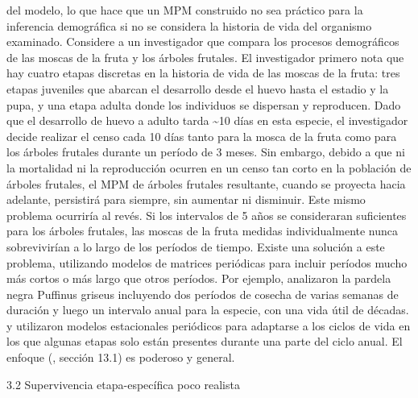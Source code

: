 \documentclass[
]{book}
\theoremstyle{definition}
\theoremstyle{definition}
\theoremstyle{definition}
\theoremstyle{definition}
\theoremstyle{remark}
\begin{document}
del modelo, lo que hace que un MPM construido no sea práctico para la inferencia demográfica si no se considera la historia de vida del organismo examinado. Considere a un investigador que compara los procesos demográficos de las moscas de la fruta y los árboles frutales. El investigador primero nota que hay cuatro etapas discretas en la historia de vida de las moscas de la fruta: tres etapas juveniles que abarcan el desarrollo desde el huevo hasta el estadio y la pupa, y una etapa adulta donde los individuos se dispersan y reproducen. Dado que el desarrollo de huevo a adulto tarda \textasciitilde10 días en esta especie, el investigador decide realizar el censo cada 10 días tanto para la mosca de la fruta como para los árboles frutales durante un período de 3 meses. Sin embargo, debido a que ni la mortalidad ni la reproducción ocurren en un censo tan corto en la población de árboles frutales, el MPM de árboles frutales resultante, cuando se proyecta hacia adelante, persistirá para siempre, sin aumentar ni disminuir. Este mismo problema ocurriría al revés. Si los intervalos de 5 años se consideraran suficientes para los árboles frutales, las moscas de la fruta medidas individualmente nunca sobrevivirían a lo largo de los períodos de tiempo. Existe una solución a este problema, utilizando modelos de matrices periódicas para incluir períodos mucho más cortos o más largo que otros períodos. Por ejemplo, \citet{hunter2010climate} analizaron la pardela negra Puffinus griseus incluyendo dos períodos de cosecha de varias semanas de duración y luego un intervalo anual para la especie, con una vida útil de décadas. \citet{smith2005stochastic} y \citet{shyu2013seasonal} utilizaron modelos estacionales periódicos para adaptarse a los ciclos de vida en los que algunas etapas solo están presentes durante una parte del ciclo anual. El enfoque (\citet{caswell2001matrix}, sección 13.1) es poderoso y general.

3.2 \textbar{} Supervivencia etapa-específica poco realista
\end{document}
